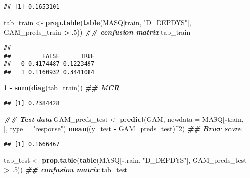 \documentclass[
]{article}
\newenvironment{Shaded}{\begin{snugshade}}{\end{snugshade}}
\newcommand{\AttributeTok}[1]{\textcolor[rgb]{0.13,0.29,0.53}{#1}}
\newcommand{\DecValTok}[1]{\textcolor[rgb]{0.00,0.00,0.81}{#1}}
\newcommand{\DocumentationTok}[1]{\textcolor[rgb]{0.56,0.35,0.01}{\textbf{\textit{#1}}}}
\newcommand{\FunctionTok}[1]{\textcolor[rgb]{0.13,0.29,0.53}{\textbf{#1}}}
\newcommand{\NormalTok}[1]{#1}
\newcommand{\OtherTok}[1]{\textcolor[rgb]{0.56,0.35,0.01}{#1}}
\newcommand{\SpecialCharTok}[1]{\textcolor[rgb]{0.81,0.36,0.00}{\textbf{#1}}}
\newcommand{\StringTok}[1]{\textcolor[rgb]{0.31,0.60,0.02}{#1}}
\begin{document}
\begin{verbatim}
## [1] 0.1653101
\end{verbatim}

\begin{Shaded}
\begin{Highlighting}[]
\NormalTok{tab\_train }\OtherTok{\textless{}{-}} \FunctionTok{prop.table}\NormalTok{(}\FunctionTok{table}\NormalTok{(MASQ[train, }\StringTok{"D\_DEPDYS"}\NormalTok{], GAM\_preds\_train }\SpecialCharTok{\textgreater{}}\NormalTok{ .}\DecValTok{5}\NormalTok{)) }\DocumentationTok{\#\# confusion matrix}
\NormalTok{tab\_train}
\end{Highlighting}
\end{Shaded}

\begin{verbatim}
##    
##         FALSE      TRUE
##   0 0.4174487 0.1223497
##   1 0.1160932 0.3441084
\end{verbatim}

\begin{Shaded}
\begin{Highlighting}[]
\DecValTok{1} \SpecialCharTok{{-}} \FunctionTok{sum}\NormalTok{(}\FunctionTok{diag}\NormalTok{(tab\_train)) }\DocumentationTok{\#\# MCR}
\end{Highlighting}
\end{Shaded}

\begin{verbatim}
## [1] 0.2384428
\end{verbatim}

\begin{Shaded}
\begin{Highlighting}[]
\DocumentationTok{\#\# Test data}
\NormalTok{GAM\_preds\_test }\OtherTok{\textless{}{-}} \FunctionTok{predict}\NormalTok{(GAM, }\AttributeTok{newdata =}\NormalTok{ MASQ[}\SpecialCharTok{{-}}\NormalTok{train, ], }\AttributeTok{type =} \StringTok{"response"}\NormalTok{)}
\FunctionTok{mean}\NormalTok{((y\_test }\SpecialCharTok{{-}}\NormalTok{ GAM\_preds\_test)}\SpecialCharTok{\^{}}\DecValTok{2}\NormalTok{) }\DocumentationTok{\#\# Brier score}
\end{Highlighting}
\end{Shaded}

\begin{verbatim}
## [1] 0.1666467
\end{verbatim}

\begin{Shaded}
\begin{Highlighting}[]
\NormalTok{tab\_test }\OtherTok{\textless{}{-}} \FunctionTok{prop.table}\NormalTok{(}\FunctionTok{table}\NormalTok{(MASQ[}\SpecialCharTok{{-}}\NormalTok{train, }\StringTok{"D\_DEPDYS"}\NormalTok{], GAM\_preds\_test }\SpecialCharTok{\textgreater{}}\NormalTok{ .}\DecValTok{5}\NormalTok{)) }\DocumentationTok{\#\# confusion matrix}
\NormalTok{tab\_test}
\end{Highlighting}
\end{Shaded}
\end{document}
